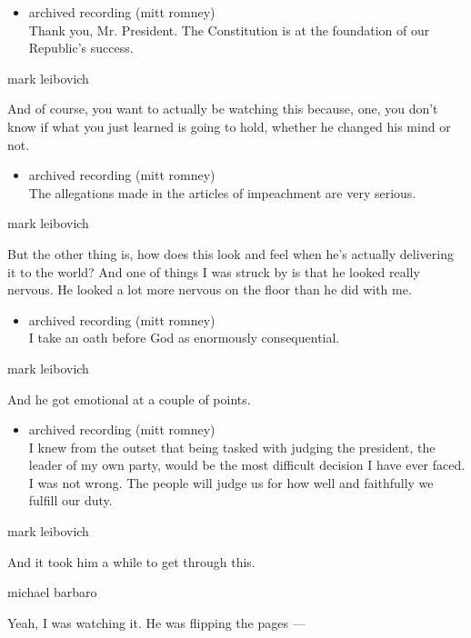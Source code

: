 \begin{itemize}
\tightlist
\item
  archived recording (mitt romney)\\
  Thank you, Mr. President. The Constitution is at the foundation of our
  Republic's success.
\end{itemize}

mark leibovich

And of course, you want to actually be watching this because, one, you
don't know if what you just learned is going to hold, whether he changed
his mind or not.

\begin{itemize}
\tightlist
\item
  archived recording (mitt romney)\\
  The allegations made in the articles of impeachment are very serious.
\end{itemize}

mark leibovich

But the other thing is, how does this look and feel when he's actually
delivering it to the world? And one of things I was struck by is that he
looked really nervous. He looked a lot more nervous on the floor than he
did with me.

\begin{itemize}
\tightlist
\item
  archived recording (mitt romney)\\
  I take an oath before God as enormously consequential.
\end{itemize}

mark leibovich

And he got emotional at a couple of points.

\begin{itemize}
\tightlist
\item
  archived recording (mitt romney)\\
  I knew from the outset that being tasked with judging the president,
  the leader of my own party, would be the most difficult decision I
  have ever faced. I was not wrong. The people will judge us for how
  well and faithfully we fulfill our duty.
\end{itemize}

mark leibovich

And it took him a while to get through this.

michael barbaro

Yeah, I was watching it. He was flipping the pages ---

